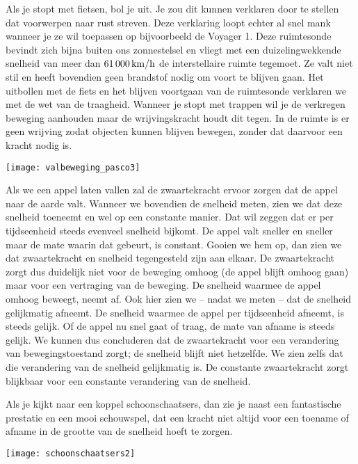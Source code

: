 \documentclass{ximera}
\begin{document}
Als je stopt met fietsen, bol je uit. Je zou dit kunnen verklaren door te stellen dat voorwerpen naar rust streven. Deze verklaring loopt echter al snel mank wanneer je ze wil toepassen op bijvoorbeeld de Voyager 1. Deze ruimtesonde bevindt zich bijna buiten ons zonnestelsel en vliegt met een duizelingwekkende snelheid van meer dan $61\,000\rm\,km/h$ de interstellaire ruimte tegemoet. Ze valt niet stil en heeft bovendien geen brandstof nodig om voort te blijven gaan. Het uitbollen met de fiets en het blijven voortgaan van de ruimtesonde verklaren we met de wet van de traagheid. Wanneer je stopt met trappen wil je de verkregen beweging aanhouden maar de wrijvingskracht houdt dit tegen. In de ruimte is er geen wrijving zodat objecten kunnen blijven bewegen, zonder dat daarvoor een kracht nodig is.

\begin{image}
% 
\texttt{[image: valbeweging\_pasco3]}
\end{image}

Als we een appel laten vallen zal de zwaartekracht ervoor zorgen dat de appel naar de aarde valt. Wanneer we bovendien de snelheid meten, zien we dat deze snelheid toeneemt en wel op een constante manier. Dat wil zeggen dat er per tijdseenheid steeds evenveel snelheid bijkomt. De appel valt sneller en sneller maar de mate waarin dat gebeurt, is constant. Gooien we hem op, dan zien we dat zwaartekracht en snelheid tegengesteld zijn aan elkaar. De zwaartekracht zorgt dus duidelijk niet voor de beweging omhoog (de appel blijft omhoog gaan) maar voor een vertraging van de beweging. De snelheid waarmee de appel omhoog beweegt, neemt af. Ook hier zien we -- nadat we meten -- dat de snelheid gelijkmatig afneemt. De snelheid waarmee de appel per tijdseenheid afneemt, is steeds gelijk. Of de appel nu snel gaat of traag, de mate van afname is steeds gelijk. We kunnen dus concluderen dat de zwaartekracht voor een verandering van bewegingstoestand zorgt; de snelheid blijft niet hetzelfde. We zien zelfs dat die verandering van de snelheid gelijkmatig is. De constante zwaartekracht zorgt blijkbaar voor een constante verandering van de snelheid. 

Als je kijkt naar een koppel schoonschaatsers, dan zie je naast een fantastische prestatie en een mooi schouwspel, dat een kracht niet altijd voor een toename of afname in de grootte van de snelheid hoeft te zorgen. 

\begin{image}
% 
\texttt{[image: schoonschaatsers2]}
\end{image}
\end{document}
